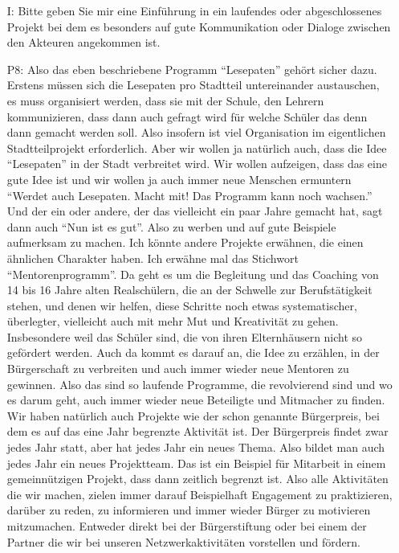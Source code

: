 \begin{itemize}
gut, dass wir uns gefragt haben "`Warum gibt es das nicht in anderen Stadtteilen?"'. Und inzwischen gibt es ein Lesepaten-Netzwerk der B{\"u}rgerstiftung weil es uns gelungen ist, vier {\"a}hnliche Projekte in anderen Stadtteilen zu entwickeln. Also insofern sind wir selbst auch ein Anbieter von B{\"u}rgerengagement. Aber wir legen gro{\ss}en Wert darauf, dass wir wei{\ss}e Flecken bedienen, und nicht in Konkurrenz zu bestehendem Engagement treten.
    \item[I:] Bitte geben Sie mir eine Einf{\"u}hrung in ein laufendes oder abgeschlossenes Projekt bei dem es besonders auf gute Kommunikation oder Dialoge zwischen den Akteuren angekommen ist.
    \item[P8:] Also das eben beschriebene Programm "`Lesepaten"' geh{\"o}rt sicher dazu. Erstens m{\"u}ssen sich die Lesepaten pro Stadtteil untereinander austauschen, es muss organisiert werden, dass sie mit der Schule, den Lehrern kommunizieren, dass dann auch gefragt wird f{\"u}r welche Sch{\"u}ler das denn dann gemacht werden soll. Also insofern ist viel Organisation im eigentlichen Stadtteilprojekt erforderlich. Aber wir wollen ja nat{\"u}rlich auch, dass die Idee "`Lesepaten"' in der Stadt verbreitet wird. Wir wollen aufzeigen, dass das eine gute Idee ist und wir wollen ja auch immer neue Menschen ermuntern "`Werdet auch Lesepaten. Macht mit! Das Programm kann noch wachsen."' Und der ein oder andere, der das vielleicht ein paar Jahre gemacht hat, sagt dann auch "`Nun ist es gut"'. Also zu werben und auf gute Beispiele aufmerksam zu machen. Ich k{\"o}nnte andere Projekte erw{\"a}hnen, die einen {\"a}hnlichen Charakter haben. Ich erw{\"a}hne mal das Stichwort "`Mentorenprogramm"'. Da geht es um die Begleitung und das Coaching von 14 bis 16 Jahre alten Realsch{\"u}lern, die an der Schwelle zur Berufst{\"a}tigkeit stehen, und denen wir helfen, diese Schritte noch etwas systematischer, {\"u}berlegter, vielleicht auch mit mehr Mut und Kreativit{\"a}t zu gehen. Insbesondere weil das Sch{\"u}ler sind, die von ihren Elternh{\"a}usern nicht so gef{\"o}rdert werden. Auch da kommt es darauf an, die Idee zu erz{\"a}hlen, in der B{\"u}rgerschaft zu verbreiten und auch immer wieder neue Mentoren zu gewinnen. Also das sind so laufende Programme, die revolvierend sind und wo es darum geht, auch immer wieder neue Beteiligte und Mitmacher zu finden. Wir haben nat{\"u}rlich auch Projekte wie der schon genannte B{\"u}rgerpreis, bei dem es auf das eine Jahr begrenzte Aktivit{\"a}t ist. Der B{\"u}rgerpreis findet zwar jedes Jahr statt, aber hat jedes Jahr ein neues Thema. Also bildet man auch jedes Jahr ein neues Projektteam. Das ist ein Beispiel f{\"u}r Mitarbeit in einem gemeinn{\"u}tzigen Projekt, dass dann zeitlich begrenzt ist. Also alle Aktivit{\"a}ten die wir machen, zielen immer darauf Beispielhaft Engagement zu praktizieren, dar{\"u}ber zu reden, zu informieren und immer wieder B{\"u}rger zu motivieren mitzumachen. Entweder direkt bei der B{\"u}rgerstiftung oder bei einem der Partner die wir bei unseren Netzwerkaktivit{\"a}ten vorstellen und f{\"o}rdern.
\end{itemize}

